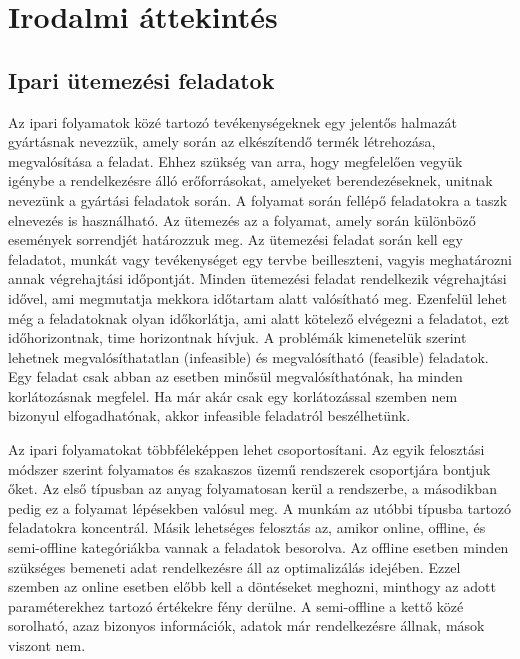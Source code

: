 \chapter{Irodalmi áttekintés}
\section{Ipari ütemezési feladatok}
Az ipari folyamatok közé tartozó tevékenységeknek egy jelentős halmazát gyártásnak nevezzük, amely során az elkészítendő termék létrehozása, megvalósítása a feladat. Ehhez szükség van arra, hogy megfelelően vegyük igénybe a rendelkezésre álló erőforrásokat, amelyeket berendezéseknek, unitnak nevezünk a gyártási feladatok során. A folyamat során fellépő feladatokra a taszk elnevezés is használható. Az ütemezés az a folyamat, amely során különböző események sorrendjét határozzuk meg. Az ütemezési feladat során kell egy feladatot, munkát vagy tevékenységet egy tervbe beilleszteni, vagyis meghatározni annak végrehajtási időpontját. Minden ütemezési feladat rendelkezik végrehajtási idővel, ami megmutatja mekkora időtartam alatt valósítható meg. Ezenfelül lehet még a feladatoknak olyan időkorlátja, ami alatt kötelező elvégezni a feladatot, ezt időhorizontnak, time horizontnak hívjuk. A problémák kimenetelük szerint lehetnek megvalósíthatatlan (infeasible) és megvalósítható (feasible) feladatok.
Egy feladat csak abban az esetben minősül megvalósíthatónak, ha minden korlátozásnak megfelel. Ha már akár csak egy korlátozással szemben nem bizonyul elfogadhatónak, akkor infeasible feladatról beszélhetünk.

Az ipari folyamatokat többféleképpen lehet csoportosítani. Az egyik felosztási módszer szerint folyamatos és szakaszos üzemű rendszerek csoportjára bontjuk őket. Az első típusban az anyag folyamatosan kerül a rendszerbe, a másodikban pedig ez a folyamat lépésekben valósul meg. A munkám az utóbbi típusba tartozó feladatokra koncentrál. Másik lehetséges felosztás az, amikor online, offline, és semi-offline kategóriákba vannak a feladatok besorolva. Az offline esetben minden szükséges bemeneti adat rendelkezésre áll az optimalizálás idejében. Ezzel szemben az online esetben előbb kell a döntéseket meghozni, minthogy az adott paraméterekhez tartozó értékekre fény derülne. A semi-offline a kettő közé sorolható, azaz bizonyos információk, adatok már rendelkezésre állnak, mások viszont nem. 

